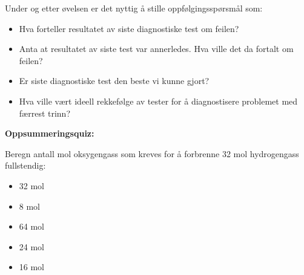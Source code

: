 Under og etter øvelsen er det nyttig å stille oppfølgingsspørsmål som:

\begin{itemize}
\item{} Hva forteller resultatet av siste diagnostiske test om feilen?
\item{} Anta at resultatet av siste test var annerledes. Hva ville det da fortalt om feilen?
\item{} Er siste diagnostiske test den beste vi kunne gjort?
\item{} Hva ville vært ideell rekkefølge av tester for å diagnostisere problemet med færrest trinn?
\end{itemize}


\vfil \eject

\noindent
{\bf Oppsummeringsquiz:}

Beregn antall mol oksygengass som kreves for å forbrenne 32 mol hydrogengass fullstendig:

\begin{itemize}
\item{} 32 mol
\vskip 5pt 
\item{} 8 mol
\vskip 5pt 
\item{} 64 mol
\vskip 5pt 
\item{} 24 mol
\vskip 5pt 
\item{} 16 mol
\end{itemize}



